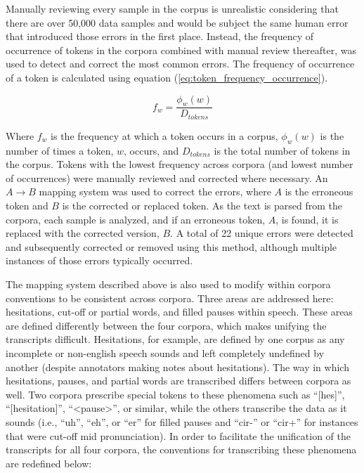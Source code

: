 \documentclass[12pt]{article}
\begin{document}
Manually reviewing every sample in the corpus is unrealistic considering that there are over 50,000 data samples and would be subject the same
human error that introduced those errors in the first place. Instead, the frequency of occurrence of tokens in the corpora combined with manual review
thereafter, was used to detect and correct the most common errors. The frequency of occurrence of a token is calculated using equation
(\ref{eq:token_frequency_occurrence}).

\begin{equation}\label{eq:token_frequency_occurrence}
    f_w = \frac{\phi_w(w)}{D_{tokens}}
\end{equation}

\noindent
Where $f_w$ is the frequency at which a token occurs in a corpus, $\phi_w(w)$ is the number of times a token, $w$, occurs, and $D_{tokens}$ is the
total number of tokens in the corpus. Tokens with the lowest frequency across corpora (and lowest number of occurrences) were manually reviewed and
corrected where necessary. An $A \rightarrow B$ mapping system was used to correct the errors, where \(A\) is the erroneous token and \(B\) is the
corrected or replaced token. As the text is parsed from the corpora, each sample is analyzed, and if an erroneous token, $A$, is found, it is replaced
with the corrected version, $B$. A total of 22 unique errors were detected and subsequently corrected or removed using this method, although multiple
instances of those errors typically occurred.

The mapping system described above is also used to modify within corpora conventions to be consistent across corpora. Three areas are addressed here:
hesitations, cut-off or partial words, and filled pauses within speech. These areas are defined differently between the four corpora, which makes
unifying the transcripts difficult. Hesitations, for example, are defined by one corpus as any incomplete or non-english speech sounds and left
completely undefined by another (despite annotators making notes about hesitations). The way in which hesitations, pauses, and partial words are
transcribed differs between corpora as well. Two corpora prescribe special tokens to these phenomena such as ``[hes]'', ``[hesitation]'', ``<pause>'',
or similar, while the others transcribe the data as it sounds (i.e., ``uh'', ``eh'', or ``er'' for filled pauses and ``cir-'' or ``cir+'' for
instances that were cut-off mid pronunciation). In order to facilitate the unification of the transcripts for all four corpora, the conventions for
transcribing these phenomena are redefined below:
\end{document}
